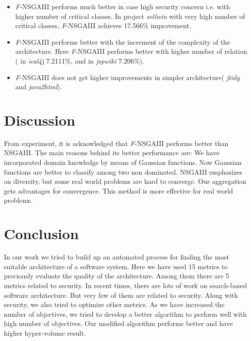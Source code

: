 \documentclass[letterpaper, 10 pt, conference]{ieeeconf}  %
\begin{document}
\begin{itemize}
\item \textit{F}-NSGAIII performs much better in case high security concern i.e. with higher number of critical classes. In project \textit{sellwin} with very high number of critical classes, \textit{F}-NSGAIII achieves  17.566\% improvement.

\item \textit{F}-NSGAIII performs better with the increment of the complexity of the architecture. Here \textit{F}-NSGAIII performs  better  with higher number of relation ( in \textit{ical4j} 7.2111\%, and  in \textit{jspwiki} 7.206\%).

\item \textit{F}-NSGAIII does not get higher improvements in simpler architecture( \textit{jtidy} and \textit{java2html}).

\end{itemize}


\section{Discussion}
From experiment, it is acknowledged that \textit{F}-NSGAIII performs 
better than NSGAIII. The main reasons behind its better performance are:
We have incorporated domain knowledge by means of Gaussian functions. Now Gaussian functions are better to classify among two non dominated.
NSGAIII emphasizes on diversity, but some real world problems are hard to converge. Our aggregation gets advantages for convergence. This method is more effective for real world problems. 











\section{Conclusion}
In our work we tried to build up an automated process for finding the most suitable architecture of a software system. Here we have used 15 metrics to preciously evaluate the quality of the architecture. Among them there are 5 metrics related to security. In recent times, there are lots of work on search-based software architecture. But very few of them are related to security. Along with security, we also tried to optimize other metrics. As we have increased the number of objectives, we tried to develop a better algorithm to perform well with high number of objectives. Our modified algorithm performs better and have higher hyper-volume result. 
\end{document}
